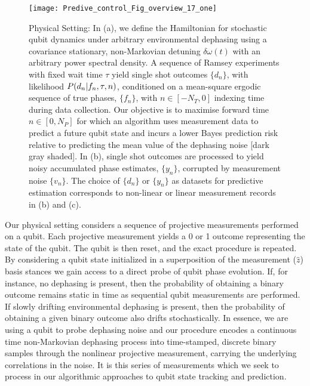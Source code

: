 \documentclass[pra, reprint]{revtex4-1}
\begin{document}
\begin{figure}[h!]
    \texttt{[image: Predive\_control\_Fig\_overview\_17\_one]} 
    \caption{ \label{fig:main:Predive_control_Fig_overview_17_one} Physical Setting: In (a), we define the Hamiltonian for stochastic qubit dynamics under arbitrary environmental dephasing using a covariance stationary, non-Markovian detuning $\delta \omega(t)$ with an arbitrary power spectral density. A sequence of Ramsey experiments with fixed wait time $\tau$ yield single shot outcomes $\{ d_n \}$, with likelihood $P(d_n|f_n, \tau,n)$,  conditioned on a mean-square ergodic sequence of true phases, $\{ f_n\}$, with $n \in [-N_T, 0]$ indexing time during data collection. Our objective is to maximise forward time $n \in [0, N_P]$ for which an algorithm uses measurement data to predict a future qubit state and incurs a lower Bayes prediction risk relative to predicting the mean value of the dephasing noise [dark gray shaded]. In (b), single shot outcomes are processed to yield noisy accumulated phase estimates, $\{ y_n\}$, corrupted by measurement noise $\{v_n\}$. The choice of $\{d_n\}$ or $\{y_n\}$ as datasets for predictive estimation corresponds to non-linear or linear measurement records in (b) and (c).}
\end{figure} 


 
Our physical setting considers a sequence of projective measurements performed on a qubit. Each projective measurement yields a 0 or 1 outcome representing the state of the qubit. The qubit is then reset, and the exact procedure is repeated. By considering a qubit state initialized in a superposition of the measurement ($\hat{z}$) basis stances we gain access to a direct probe of qubit phase evolution.  If, for instance, no dephasing is present, then the probability of obtaining a binary outcome remains static in time as sequential qubit measurements are performed. If slowly drifting environmental dephasing is present, then the probability of obtaining a given binary outcome also drifts stochastically. In essence, we are using a qubit to probe dephasing noise and our procedure encodes a continuous time non-Markovian dephasing process into time-stamped, discrete binary samples through the nonlinear projective measurement, carrying the underlying correlations in the noise.  It is this series of measurements which we seek to process in our algorithmic approaches to qubit state tracking and prediction. 
\end{document}
